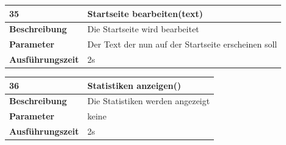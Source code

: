 \documentclass[fontsize=12pt,paper=a4,twoside]{scrartcl}
\begin{document}
\begin{table}
	[H] \label{a35} 
	\begin{tabular}
		{|l|p{10cm}|} \hline \textbf{35} & \textbf{Startseite bearbeiten(text)} \\
		\hline \textbf{Beschreibung} & Die Startseite wird bearbeitet\\
		\hline \textbf{Parameter} & Der Text der nun auf der Startseite erscheinen soll\\\hline \textbf{Ausführungszeit} & 2s\\
		\hline 
	\end{tabular}
\end{table}
\begin{table}
	[H] \label{a36} 
	\begin{tabular}
		{|l|p{10cm}|} \hline \textbf{36} & \textbf{Statistiken anzeigen()} \\
		\hline \textbf{Beschreibung} & Die Statistiken werden angezeigt\\
		\hline \textbf{Parameter} & keine \\
		\hline \textbf{Ausführungszeit} & 2s\\
		\hline 
	\end{tabular}
\end{table}
\end{document}
